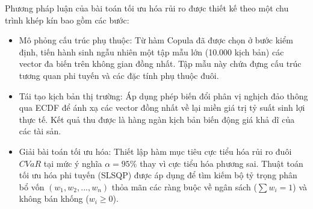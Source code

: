 Phương pháp luận của bài toán tối ưu hóa rủi ro được thiết kế theo một chu trình khép kín bao gồm các bước:
\begin{itemize}
    \item Mô phỏng cấu trúc phụ thuộc: Từ hàm Copula đã được chọn ở bước kiểm định, tiến hành sinh ngẫu nhiên một tập mẫu lớn (10.000 kịch bản) các vector đa biến trên không gian đồng nhất. Tập mẫu này chứa đựng cấu trúc tương quan phi tuyến và các đặc tính phụ thuộc đuôi.
    \item Tái tạo kịch bản thị trường: Áp dụng phép biến đổi phân vị nghịch đảo thông qua ECDF để ánh xạ các vector đồng nhất về lại miền giá trị tỷ suất sinh lợi thực tế. Kết quả thu được là hàng ngàn kịch bản biến động giá khả dĩ của các tài sản.
    \item Giải bài toán tối ưu hóa: Thiết lập hàm mục tiêu cực tiểu hóa rủi ro đuôi $CVaR$ tại mức ý nghĩa $\alpha=95\%$ thay vì cực tiểu hóa phương sai. Thuật toán tối ưu hóa phi tuyến (SLSQP) được áp dụng để tìm kiếm bộ tỷ trọng phân bổ vốn $(w_1, w_2, ..., w_n)$ thỏa mãn các ràng buộc về ngân sách ($\sum w_i = 1$) và không bán khống ($w_i \ge 0$).
\end{itemize}